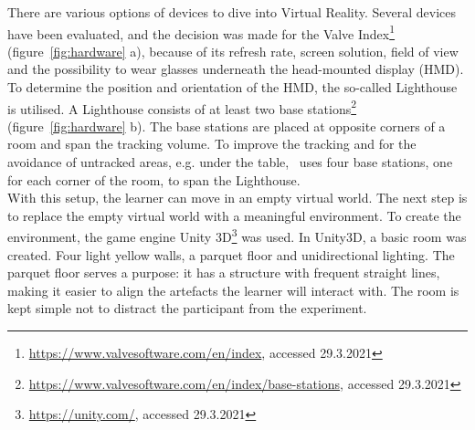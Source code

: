 There are various options of devices to dive into Virtual Reality. Several devices have been evaluated, and the decision was made for the Valve Index\footnote{\href{https://www.valvesoftware.com/en/index}{https://www.valvesoftware.com/en/index}, accessed 29.3.2021} (figure~\ref{fig:hardware} a), because of its refresh rate, screen solution, field of view and the possibility to wear glasses underneath the head-mounted display (HMD). To determine the position and orientation of the HMD, the so-called Lighthouse is utilised. A Lighthouse consists of at least two base stations\footnote{\href{https://www.valvesoftware.com/en/index/base-stations}{https://www.valvesoftware.com/en/index/base-stations}, accessed 29.3.2021} (figure~\ref{fig:hardware} b). The base stations are placed at opposite corners of a room and span the tracking volume. To improve the tracking and for the avoidance of untracked areas, e.g. under the table, \exgo\ uses four base stations, one for each corner of the room, to span the Lighthouse.\\
With this setup, the learner can move in an empty virtual world. The next step is to replace the empty virtual world with a meaningful environment. To create the environment, the game engine Unity 3D\footnote{\href{https://unity.com/}{https://unity.com/}, accessed 29.3.2021} was used. In Unity3D, a basic room was created. Four light yellow walls, a parquet floor and unidirectional lighting. The parquet floor serves a purpose: it has a structure with frequent straight lines, making it easier to align the artefacts the learner will interact with. The room is kept simple not to distract the participant from the experiment.\\
